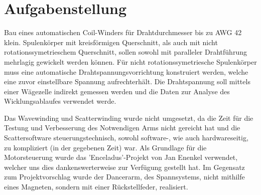 \section{Aufgabenstellung}
\label{sec:Aufgabenstellung}


Bau eines automatischen Coil-Winders für Drahtdurchmesser bis zu AWG 42 klein. Spulenkörper mit kreisförmigen Querschnitt, als auch mit nicht rotationssymetrieschem Querschnitt, sollen sowohl mit paralleler Drahtführung mehrlagig gewickelt werden können. Für nicht rotationssymetriesche Spulenkörper muss eine automatische Drahtspannungsvorrichtung konstruiert werden, welche eine zuvor einstellbare Spannung aufrechterhält. Die Drahtspannung soll mittels einer Wägezelle indirekt gemessen werden und die Daten zur Analyse des Wicklungsablaufes verwendet werde.

Das Wavewinding und Scatterwinding wurde nicht umgesetzt, da die Zeit für die Testung und Verbesserung des Notwendigen Arms nicht gereicht hat und die Scattersoftware steuerungstechnisch, sowohl software-, wie auch hardwareseitig, zu kompliziert (in der gegebenen Zeit) war. Als Grundlage für die Motorsteuerung wurde das 'Enceladus'-Projekt von Jan Enenkel verwendet, welcher uns dies dankenswerterweise zur Verfügung gestellt hat. Im Gegensatz zum Projektvorschlag wurde der Dancerarm, des Spannsystems, nicht mithilfe eines Magneten, sondern mit einer Rückstellfeder, realisiert.